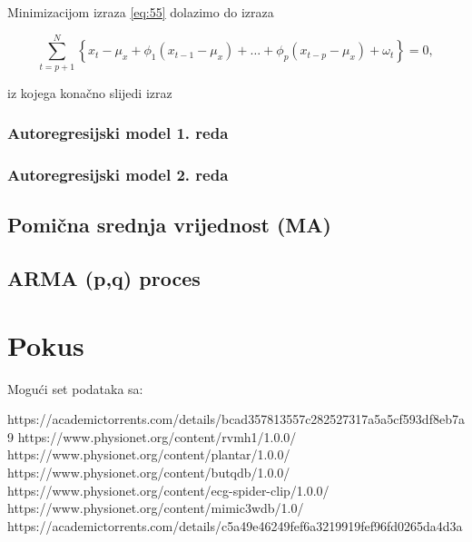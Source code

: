 \documentclass[a4paper,12pt,oneside]{memoir}
\begin{document}
            Minimizacijom izraza \eqref{eq:55} dolazimo do izraza
            
            \begin{equation}
                \displaystyle\sum_{t=p+1}^N\left\{x_t-\mu_x+\phi_1\left(x_{t-1}-\mu_x\right)+\ldots+\phi_p\left(x_{t-p}-\mu_x\right)+\omega_t\right\}=0,
            \end{equation}
            \label{subs:511}

            iz kojega konačno slijedi izraz


            \subsection{Autoregresijski model 1. reda}
            \label{subs:512}
            \subsection{Autoregresijski model 2. reda}
            \label{subs:513}




        \section{Pomična srednja vrijednost (MA)}

        \section{ARMA (p,q) proces}

    \chapter{Pokus}
        Mogući set podataka sa:

        https://academictorrents.com/details/bcad357813557c282527317a5a5cf593df8eb7a9
        https://www.physionet.org/content/rvmh1/1.0.0/
        https://www.physionet.org/content/plantar/1.0.0/
        https://www.physionet.org/content/butqdb/1.0.0/
        https://www.physionet.org/content/ecg-spider-clip/1.0.0/
        https://www.physionet.org/content/mimic3wdb/1.0/
        https://academictorrents.com/details/c5a49e46249fef6a3219919fef96fd0265da4d3a
\end{document}

